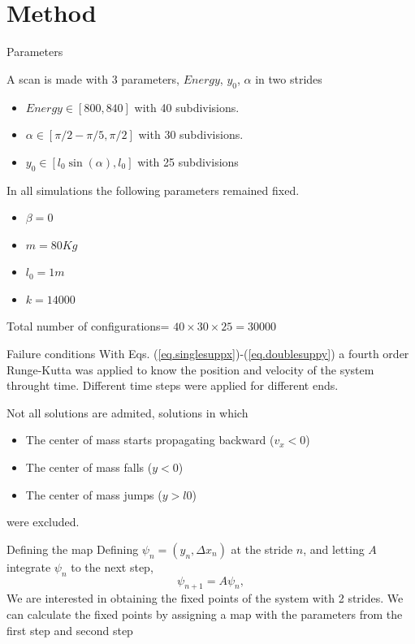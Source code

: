 \documentclass{beamer}
\begin{document}
\section{Method}
\begin{frame}{Parameters}

    \begin{block}{A scan is made with 3 parameters, $Energy$, $y_0$, $\alpha$ in two strides}
    \begin{itemize}
\item $Energy \in  [800,840]$ with 40 subdivisions.

\item  $\alpha \in [\pi/2-\pi/5,\pi/2]$ with 30 subdivisions.

\item  $y_0 \in [l_0\sin(\alpha) ,l_0]$ with 25 subdivisions
    \end{itemize}
\end{block}
  In all simulations the following parameters remained fixed.
  \begin{itemize}
    
\item $\beta=0$
  
\item  $m=80 Kg$
  
\item $l_0=1 m$

\item  $k=14000$

 \end{itemize}

Total number of configurations= $40 \times 30 \times 25 = 30000$

 
\end{frame}

\begin{frame}{Failure conditions}
  With Eqs. (\ref{eq.singlesuppx})-(\ref{eq.doublesuppy}) a fourth order Runge-Kutta was applied to know the position and velocity of the system throught time. Different time steps were applied for different ends.
  
  Not all solutions are admited, solutions in which
  \begin{itemize}
  \item The center of mass starts propagating backward ($v_x<0$)
  \item The center of mass falls ($y<0$)
  \item The center of mass jumps ($y>l0$)  
  \end{itemize}
  were excluded.
  \end{frame}
\begin{frame}{Defining the map}
  Defining $\psi_n=(y_n,\Delta x_n)$ at the stride $n$, and letting $A$ integrate $\psi_n$ to the next step,
  \begin{equation}
    \psi_{n+1}=A \psi_n,
  \end{equation}
  We are interested in obtaining the fixed points of the system with 2 strides.
  We can calculate the fixed points by assigning a map with the parameters from the first step and second step
\end{frame}
\end{document}
